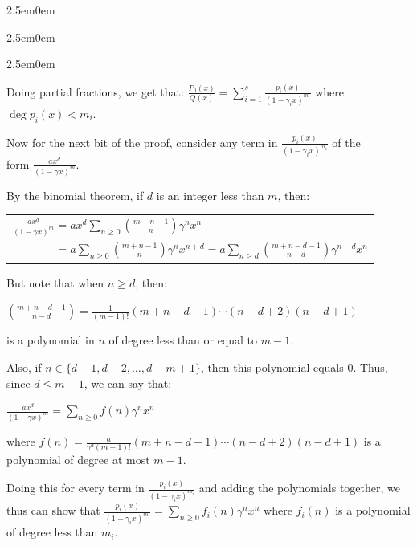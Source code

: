 \documentclass{book}
\newenvironment{myIndent}{%
   \begin{adjustwidth}{2.5em}{0em}%
}{%
   \end{adjustwidth}%
}
\newcommand{\retTwo}{\hfill\bigbreak}
\begin{document}
\begin{myIndent}
\begin{myIndent}
\begin{myIndent}
         Doing partial fractions, we get that: $\frac{P_0(x)}{Q(x)} = \sum\limits_{i=1}^s \frac{p_i(x)}{(1-\gamma_i x)^{m_i}}$ where\\ [-8pt] $\deg p_i(x) < m_i$.\retTwo

         Now for the next bit of the proof, consider any term in $\frac{p_i(x)}{(1-\gamma_i x)^{m_i}}$ of the\\ [-5pt] form $\frac{ax^d}{(1 - \gamma x)^m}$.\retTwo

         By the binomial theorem, if $d$ is an integer less than $m$, then:

         {\centering
         \begin{tabular}{l}
            $\frac{ax^d}{(1-\gamma x)^m} = ax^d\sum\limits_{n \geq 0}\binom{m + n - 1}{n}\gamma^n x^n$\\ [12pt]
            $\phantom{\frac{x^d}{(1-\gamma x)^m}} = a\sum\limits_{n \geq 0}\binom{m + n - 1}{n}\gamma^nx^{n+d} = a\sum\limits_{n \geq d}\binom{m+n-d-1}{n-d}\gamma^{n-d}x^n$
         \end{tabular}\retTwo\par}

         But note that when $n \geq d$, then:\\ [-10pt]
         
         {\centering $\binom{m+n-d-1}{n-d} = \frac{1}{(m-1)!}(m+n-d-1)\cdots(n-d+2)(n-d+1)$\\ [4pt]\par} 
         
         is a polynomial in $n$ of degree less than or equal to $m - 1$.\retTwo

         Also, if $n\in \{d-1, d-2, \ldots, d-m+1\}$, then this polynomial equals $0$. Thus, since $d \leq m - 1$, we can say that:\\ [-8pt]
         
         {\centering $\frac{ax^d}{(1-\gamma x)^m} = \sum\limits_{n \geq 0}f(n)\gamma^nx^n$ \\ [2pt]\par}

         where $f(n) = \frac{a}{\gamma^{d}(m-1)!}(m+n-d-1)\cdots(n-d+2)(n-d+1)$ is a polynomial of degree at most $m - 1$.\newpage

         Doing this for every term in $\frac{p_i(x)}{(1-\gamma_i x)^{m_i}}$ and adding the polynomials together, we\\ [2pt] thus can show that $\frac{p_i(x)}{(1-\gamma_i x)^{m_i}} = \sum\limits_{n \geq 0} f_i(n)\gamma^nx^n$ where $f_i(n)$ is a polynomial\\ [3pt] of degree less than $m_i$.\retTwo


\end{myIndent}
\end{myIndent}
\end{myIndent}
\end{document}
